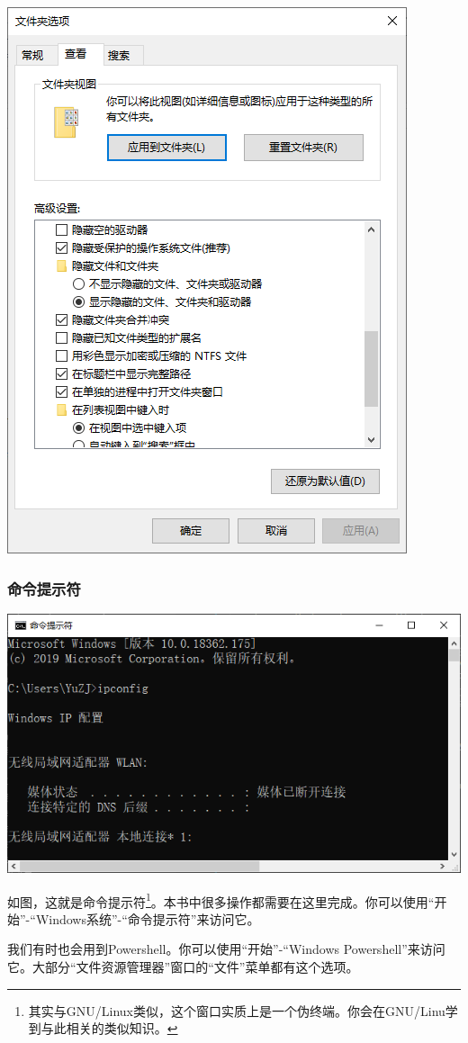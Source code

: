 \begin{center}
	\includegraphics[scale=0.8]{pic/expset}
\end{center} \par
\subsubsection{命令提示符}
\begin{center}
	\includegraphics[scale=0.8]{pic/cmd}
\end{center} \par
如图，这就是命令提示符\footnote{其实与GNU/Linux类似，这个窗口实质上是一个伪终端。你会在GNU/Linu学到与此相关的类似知识。}。本书中很多操作都需要在这里完成。你可以使用“开始”-“Windows系统”-“命令提示符”来访问它。\par
我们有时也会用到Powershell。你可以使用“开始”-“Windows Powershell”来访问它。大部分“文件资源管理器”窗口的“文件”菜单都有这个选项。
